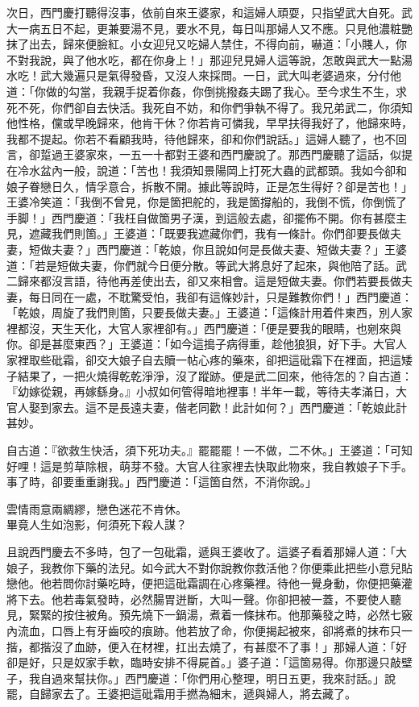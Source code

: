 次日，西門慶打聽得沒事，依前自來王婆家，和這婦人頑耍，只指望武大自死。武大一病五日不起，更兼要湯不見，要水不見，每日叫那婦人又不應。只見他濃粧艷抹了出去，歸來便臉紅。小女迎兒又吃婦人禁住，不得向前，嚇道：「小賤人，你不對我說，與了他水吃，都在你身上！」那迎兒見婦人這等說，怎敢與武大一點湯水吃！武大幾遍只是氣得發昏，又沒人來採問。一日，武大叫老婆過來，分付他道：「你做的勾當，我親手捉着你姦，你倒挑撥姦夫踢了我心。至今求生不生，求死不死，你們卻自去快活。我死自不妨，和你們爭執不得了。我兄弟武二，你須知他性格，儻或早晚歸來，他肯干休？你若肯可憐我，早早扶得我好了，他歸來時，我都不提起。你若不看顧我時，待他歸來，卻和你們說話。」這婦人聽了，也不回言，卻踅過王婆家來，一五一十都對王婆和西門慶說了。那西門慶聽了這話，似提在冷水盆內一般，說道：「苦也！我須知景陽岡上打死大蟲的武都頭。我如今卻和娘子眷戀日久，情孚意合，拆散不開。據此等說時，正是怎生得好？卻是苦也！」王婆冷笑道：「我倒不曾見，你是箇把舵的，我是箇撐船的，我倒不慌，你倒慌了手脚！」西門慶道：「我枉自做箇男子漢，到這般去處，卻擺佈不開。你有甚麼主見，遮藏我們則箇。」王婆道：「既要我遮藏你們，我有一條計。你們卻要長做夫妻，短做夫妻？」{}西門慶道：「乾娘，你且說如何是長做夫妻、短做夫妻？」王婆道：「若是短做夫妻，你們就今日便分散。等武大將息好了起來，與他陪了話。武二歸來都沒言語，待他再差使出去，卻又來相會。這是短做夫妻。你們若要長做夫妻，每日同在一處，不耽驚受怕，我卻有這條妙計，只是難教你們！」西門慶道：「乾娘，周旋了我們則箇，只要長做夫妻。」王婆道：「這條計用着件東西，別人家裡都沒，天生天化，大官人家裡卻有。」西門慶道：「便是要我的眼睛，也剜來與你。卻是甚麼東西？」王婆道：「如今這搗子病得重，趁他狼狽，好下手。{}大官人家裡取些砒霜，卻交大娘子自去贖一帖心疼的藥來，卻把這砒霜下在裡面，把這矮子結果了，一把火燒得乾乾淨淨，沒了蹤跡。便是武二回來，他待怎的？自古道：『幼嫁從親，再嫁繇身。』小叔如何管得暗地裡事！半年一載，等待夫孝滿日，大官人娶到家去。這不是長遠夫妻，偕老同歡！此計如何？」西門慶道：「乾娘此計甚妙。

自古道：『欲救生快活，須下死功夫。』罷罷罷！一不做，二不休。」王婆道：「可知好哩！這是剪草除根，萌芽不發。{}大官人往家裡去快取此物來，我自教娘子下手。事了時，卻要重重謝我。」西門慶道：「這箇自然，不消你說。」

\begin{myquote} 
雲情雨意兩綢繆，戀色迷花不肯休。\\畢竟人生如泡影，何須死下殺人謀？
\end{myquote} 

且說西門慶去不多時，包了一包砒霜，遞與王婆收了。這婆子看着那婦人道：「大娘子，我教你下藥的法兒。如今武大不對你說教你救活他？你便乘此把些小意兒貼戀他。他若問你討藥吃時，便把這砒霜調在心疼藥裡。待他一覺身動，你便把藥灌將下去。他若毒氣發時，必然腸胃迸斷，大叫一聲。你卻把被一蓋，不要使人聽見，緊緊的按住被角。{}預先燒下一鍋湯，煮着一條抹布。他那藥發之時，必然七竅內流血，口唇上有牙齒咬的痕跡。他若放了命，你便揭起被來，卻將煮的抹布只一揩，都揩沒了血跡，便入在材裡，扛出去燒了，有甚麼不了事！」那婦人道：「好卻是好，{}只是奴家手軟，臨時安排不得屍首。」婆子道：「這箇易得。你那邊只敲壁子，我自過來幫扶你。」西門慶道：「你們用心整理，明日五更，我來討話。」說罷，自歸家去了。王婆把這砒霜用手撚為細末，遞與婦人，將去藏了。

